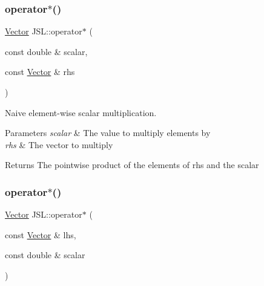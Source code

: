 \mbox{\label{namespaceJSL_ab4eefbed468f275164855895335b8a29}} 
\subsubsection{\texorpdfstring{operator$\ast$()}{operator*()}\hspace{0.1cm}{\footnotesize\ttfamily [3/8]}}
{\footnotesize\ttfamily \hyperlink{classJSL_1_1Vector}{Vector} J\+S\+L\+::operator$\ast$ (\begin{DoxyParamCaption}\item[{const double \&}]{scalar,  }\item[{const \hyperlink{classJSL_1_1Vector}{Vector} \&}]{rhs }\end{DoxyParamCaption})\hspace{0.3cm}{\ttfamily [inline]}}



Naive element-\/wise scalar multiplication. 


\begin{DoxyParams}{Parameters}
{\em scalar} & The value to multiply elements by \\
\hline
{\em rhs} & The vector to multiply \\
\hline
\end{DoxyParams}
\begin{DoxyReturn}{Returns}
The pointwise product of the elements of rhs and the scalar 
\end{DoxyReturn}
\mbox{\label{namespaceJSL_afc5e092de4a9bdc5795d40ee0f51c7b9}} 
\subsubsection{\texorpdfstring{operator$\ast$()}{operator*()}\hspace{0.1cm}{\footnotesize\ttfamily [4/8]}}
{\footnotesize\ttfamily \hyperlink{classJSL_1_1Vector}{Vector} J\+S\+L\+::operator$\ast$ (\begin{DoxyParamCaption}\item[{const \hyperlink{classJSL_1_1Vector}{Vector} \&}]{lhs,  }\item[{const double \&}]{scalar }\end{DoxyParamCaption})\hspace{0.3cm}{\ttfamily [inline]}}




